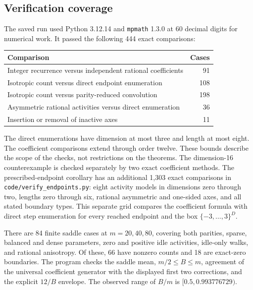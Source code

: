\documentclass[11pt,letterpaper]{article}
\theoremstyle{remark}\newtheorem{remark}[theorem]{Remark}
\begin{document}
\noindent\begin{minipage}{\linewidth}
\subsection{Verification coverage}

The saved run used Python 3.12.14 and \texttt{mpmath} 1.3.0 at 60 decimal
digits for numerical work. It passed the following 444 exact comparisons:
\begin{center}
\begin{tabular}{@{}lr@{}}
\toprule
Comparison & Cases\\
\midrule
Integer recurrence versus independent rational coefficients & 91\\
Isotropic count versus direct endpoint enumeration & 108\\
Isotropic count versus parity-reduced convolution & 198\\
Asymmetric rational activities versus direct enumeration & 36\\
Insertion or removal of inactive axes & 11\\
\bottomrule
\end{tabular}
\end{center}
\end{minipage}
\par\medskip
The direct enumerations have dimension at most three and length at
most eight. The coefficient comparisons extend through order twelve.
These bounds describe the scope of the checks, not restrictions on
the theorems. The dimension-16 counterexample is checked separately
by two exact coefficient methods.
The prescribed-endpoint corollary has an additional 1,303 exact
comparisons in \texttt{code/verify\_endpoints.py}: eight activity models
in dimensions zero through two, lengths zero through six, rational
asymmetric and one-sided axes, and all stated boundary types. This
separate grid compares the coefficient formula with direct step
enumeration for every reached endpoint and the box $\{-3,\ldots,3\}^D$.

There are 84 finite saddle cases at $m=20,40,80$, covering both
parities, sparse, balanced and dense parameters, zero and positive
idle activities, idle-only walks, and rational anisotropy. Of these,
66 have nonzero counts and 18 are exact-zero boundaries. The program
checks the saddle mean, $m/2\le B\le m$, agreement of the universal
coefficient generator with the displayed first two corrections, and
the explicit $12/B$ envelope. The observed range of $B/m$ is
$[0.5,0.993776729)$.
\end{document}
